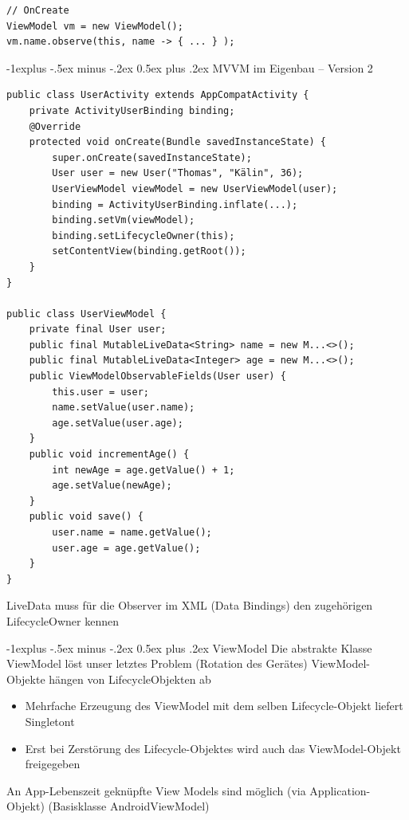 \documentclass[10pt,landscape,a4paper]{article}
\makeatletter
\renewcommand{\subsection}{\@startsection{subsection}{2}{0mm}%
                                {-1explus -.5ex minus -.2ex}%
                                {0.5ex plus .2ex}%
                                {\normalfont\small\bfseries}}
\makeatother
\begin{document}
\begin{multicols*}{3}
\begin{verbatim}
// OnCreate
ViewModel vm = new ViewModel();
vm.name.observe(this, name -> { ... } );
\end{verbatim}
\subsection{MVVM im Eigenbau – Version 2}
\begin{verbatim}
public class UserActivity extends AppCompatActivity {
    private ActivityUserBinding binding;
    @Override
    protected void onCreate(Bundle savedInstanceState) {
        super.onCreate(savedInstanceState);
        User user = new User("Thomas", "Kälin", 36);
        UserViewModel viewModel = new UserViewModel(user);
        binding = ActivityUserBinding.inflate(...);
        binding.setVm(viewModel);
        binding.setLifecycleOwner(this);
        setContentView(binding.getRoot());
    }
}

public class UserViewModel {
    private final User user;
    public final MutableLiveData<String> name = new M...<>();
    public final MutableLiveData<Integer> age = new M...<>();
    public ViewModelObservableFields(User user) {
        this.user = user;
        name.setValue(user.name);
        age.setValue(user.age);
    }
    public void incrementAge() {
        int newAge = age.getValue() + 1;
        age.setValue(newAge);
    }
    public void save() {
        user.name = name.getValue();
        user.age = age.getValue();
    }
}
\end{verbatim}
LiveData muss für die Observer im XML (Data Bindings) den zugehörigen LifecycleOwner kennen

\subsection{ViewModel}
Die abstrakte Klasse ViewModel löst unser
letztes Problem (Rotation des Gerätes)
ViewModel-Objekte hängen von LifecycleObjekten ab
\begin{itemize}[leftmargin=*]
\item{Mehrfache Erzeugung des ViewModel mit dem
selben Lifecycle-Objekt liefert Singletont}
\item{Erst bei Zerstörung des Lifecycle-Objektes
wird auch das ViewModel-Objekt freigegeben}
\end{itemize}

An App-Lebenszeit geknüpfte View Models sind möglich (via Application-Objekt) (Basisklasse AndroidViewModel)


\end{multicols*}
\end{document}
